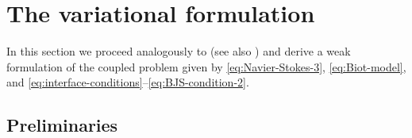 \documentclass[11pt]{article}
\numberwithin{equation}{section}
\newcommand{\0}{{\mathbf{0}}}
\numberwithin{equation}{section}
\begin{document}

\section{The variational formulation}\label{sec:variational-formulation}

In this section we proceed analogously to \cite[Section~3]{aeny2019} (see also \cite{cgos2017,cly2022,gmor2014}) and derive a weak formulation of the coupled problem given by \eqref{eq:Navier-Stokes-3}, \eqref{eq:Biot-model}, and \eqref{eq:interface-conditions}--\eqref{eq:BJS-condition-2}.
 
 
\subsection{Preliminaries}
\end{document}
